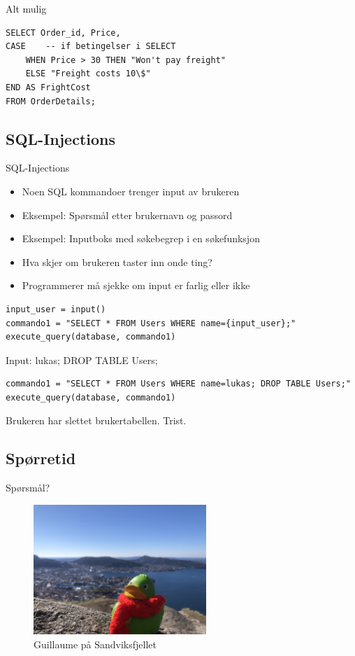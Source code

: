\begin{frame}[fragile]{Alt mulig}
\begin{verbatim}
SELECT Order_id, Price,
CASE    -- if betingelser i SELECT
    WHEN Price > 30 THEN "Won't pay freight"
    ELSE "Freight costs 10\$"
END AS FrightCost
FROM OrderDetails; 
\end{verbatim}
\end{frame}

\subsection*{SQL-Injections}
\begin{frame}{SQL-Injections}
    \begin{itemize}[<+->]
        \item Noen SQL kommandoer trenger input av brukeren
        \item Eksempel: Spørsmål etter brukernavn og passord
        \item Eksempel: Inputboks med søkebegrep i en søkefunksjon
        \item Hva skjer om brukeren taster inn onde ting?
        \item Programmerer må sjekke om input er farlig eller ikke
    \end{itemize}
\end{frame}

\begin{frame}[fragile]{}
\begin{verbatim}
input_user = input()
commando1 = "SELECT * FROM Users WHERE name={input_user};"
execute_query(database, commando1)
\end{verbatim}
\pause
Input: lukas; DROP TABLE Users;
\pause
\begin{verbatim}
commando1 = "SELECT * FROM Users WHERE name=lukas; DROP TABLE Users;"
execute_query(database, commando1)
\end{verbatim}
\pause
Brukeren har slettet brukertabellen. \pause Trist.
\end{frame}

\subsection*{Spørretid}
\begin{frame}{Spørsmål?}
    \begin{figure}
        \centering
        \includegraphics[height = 4.9cm]{images/guillaume1.jpg}
        \caption{Guillaume på Sandviksfjellet}
        \label{fig:guillaume1}
    \end{figure}
\end{frame}